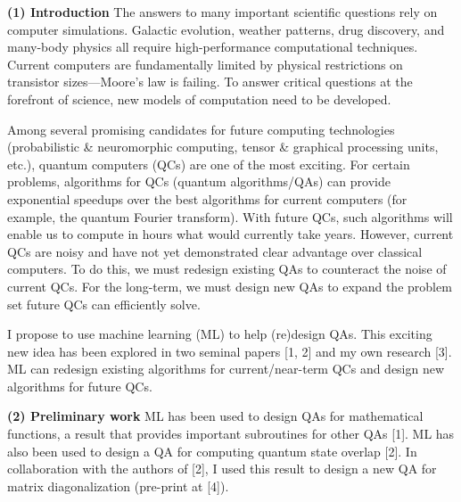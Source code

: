 \documentclass[12pt]{article}
\renewcommand{\>}{\rangle}
\newcommand{\tab}{\hspace*{0.8em}}
\begin{document}

\justify 



\textbf{(1) Introduction} \tab The answers to many important scientific questions rely on computer simulations. Galactic evolution, weather patterns, drug discovery, and many-body physics all require high-performance computational techniques. Current computers are fundamentally limited by physical restrictions on transistor sizes---Moore's law is failing. To answer critical questions at the forefront of science, new models of computation need to be developed.

\noindent
\tab Among several promising candidates for future computing technologies (probabilistic \& neuromorphic computing, tensor \& graphical processing units, etc.), quantum computers (QCs) are one of the most exciting. For certain problems, algorithms for QCs (quantum algorithms/QAs) can provide exponential speedups over the best algorithms for current computers (for example, the quantum Fourier transform). With future QCs, such algorithms will enable us to compute in hours what would currently take years. However, current QCs are noisy and have not yet demonstrated clear advantage over classical computers. To do this, we must redesign existing QAs to counteract the noise of current QCs. For the long-term, we must design new QAs to expand the problem set future QCs can efficiently solve.

\noindent
\tab I propose to use machine learning (ML) to help (re)design QAs. This exciting new idea has been explored in two seminal papers [1, 2] and my own research [3]. ML can redesign existing algorithms for current/near-term QCs and design new algorithms for future QCs.


\noindent
\textbf{(2) Preliminary work} \tab ML has been used to design QAs for mathematical functions, a result that provides important subroutines for other QAs [1]. ML has also been used to design a QA for computing quantum state overlap [2]. In collaboration with the authors of [2], I used this result to design a new QA for matrix diagonalization (pre-print at [4]).
\end{document}
